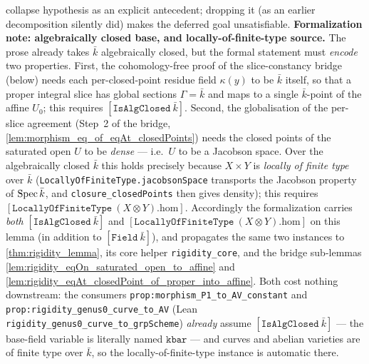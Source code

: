 \begin{lemma}
  collapse hypothesis as an explicit antecedent; dropping it (as an earlier decomposition
  silently did) makes the deferred goal unsatisfiable.
  \medskip
  \noindent\textbf{Formalization note: algebraically closed base, and locally-of-finite-type
  source.} The prose already takes \(\bar k\) algebraically closed, but the formal statement must
  \emph{encode} two properties. First, the cohomology-free proof of the slice-constancy bridge
  (below) needs each per-closed-point residue field \(\kappa(y)\) to be \(\bar k\) itself, so that a
  proper integral slice has global sections \(\Gamma = \bar k\) and maps to a single \(\bar k\)-point of
  the affine \(U_0\); this requires \([\mathtt{IsAlgClosed}\ \bar k]\). Second, the globalisation of the
  per-slice agreement (Step~2 of the bridge, \cref{lem:morphism_eq_of_eqAt_closedPoints}) needs the
  closed points of the saturated open \(U\) to be \emph{dense} --- i.e.\ \(U\) to be a Jacobson space.
  Over the algebraically closed \(\bar k\) this holds precisely because \(X \times Y\) is \emph{locally of
  finite type} over \(\bar k\) (\texttt{LocallyOfFiniteType.jacobsonSpace} transports the Jacobson
  property of \(\operatorname{Spec} \bar k\), and \texttt{closure\_closedPoints} then gives density); this requires
  \([\mathtt{LocallyOfFiniteType}\ (X \otimes Y).\mathrm{hom}]\). Accordingly the formalization carries
  \emph{both} \([\mathtt{IsAlgClosed}\ \bar k]\) and
  \([\mathtt{LocallyOfFiniteType}\ (X \otimes Y).\mathrm{hom}]\) on this lemma (in addition to
  \([\mathtt{Field}\ \bar k]\)), and propagates the same two instances to \cref{thm:rigidity_lemma},
  its core helper \texttt{rigidity\_core}, and the bridge sub-lemmas
  \cref{lem:rigidity_eqOn_saturated_open_to_affine} and
  \cref{lem:rigidity_eqAt_closedPoint_of_proper_into_affine}. Both cost nothing downstream: the
  consumers \texttt{prop:morphism_P1_to_AV_constant} and \texttt{prop:rigidity_genus0_curve_to_AV} (Lean
  \texttt{rigidity\_genus0\_curve\_to\_grpScheme}) \emph{already} assume
  \([\mathtt{IsAlgClosed}\ \bar k]\) --- the base-field variable is literally named \(\mathtt{kbar}\) ---
  and curves and abelian varieties are of finite type over \(\bar k\), so the
  locally-of-finite-type instance is automatic there.
\end{lemma}
